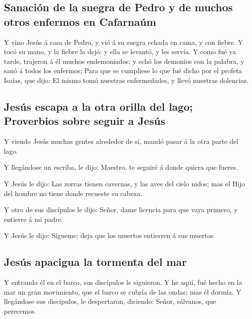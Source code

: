 \hypertarget{sanaciuxf3n-de-la-suegra-de-pedro-y-de-muchos-otros-enfermos-en-cafarnauxfam}{%
\subsection{Sanación de la suegra de Pedro y de muchos otros enfermos en
Cafarnaúm}\label{sanaciuxf3n-de-la-suegra-de-pedro-y-de-muchos-otros-enfermos-en-cafarnauxfam}}

 Y vino Jesús á casa de Pedro, y vió á su suegra echada en
cama, y con fiebre.  Y tocó su mano, y la fiebre la dejó: y
ella se levantó, y les servía.  Y como fué ya tarde,
trajeron á él muchos endemoniados; y echó los demonios con la palabra, y
sanó á todos los enfermos;  Para que se cumpliese lo que
fué dicho por el profeta Isaías, que dijo: El mismo tomó nuestras
enfermedades, y llevó nuestras dolencias.

\hypertarget{jesuxfas-escapa-a-la-otra-orilla-del-lago-proverbios-sobre-seguir-a-jesuxfas}{%
\subsection{Jesús escapa a la otra orilla del lago; Proverbios sobre
seguir a
Jesús}\label{jesuxfas-escapa-a-la-otra-orilla-del-lago-proverbios-sobre-seguir-a-jesuxfas}}

 Y viendo Jesús muchas gentes alrededor de sí, mandó pasar
á la otra parte del lago.

 Y llegándose un escriba, le dijo: Maestro, te seguiré á
donde quiera que fueres.

 Y Jesús le dijo: Las zorras tienen cavernas, y las aves
del cielo nidos; mas el Hijo del hombre no tiene donde recueste su
cabeza.

 Y otro de sus discípulos le dijo: Señor, dame licencia
para que vaya primero, y entierre á mi padre.

 Y Jesús le dijo: Sígueme; deja que los muertos entierren á
sus muertos.

\hypertarget{jesuxfas-apacigua-la-tormenta-del-mar}{%
\subsection{Jesús apacigua la tormenta del
mar}\label{jesuxfas-apacigua-la-tormenta-del-mar}}

 Y entrando él en el barco, sus discípulos le siguieron.
 Y he aquí, fué hecho en la mar un gran movimiento, que el
barco se cubría de las ondas; mas él dormía.  Y llegándose
sus discípulos, le despertaron, diciendo: Señor, sálvanos, que
perecemos.

